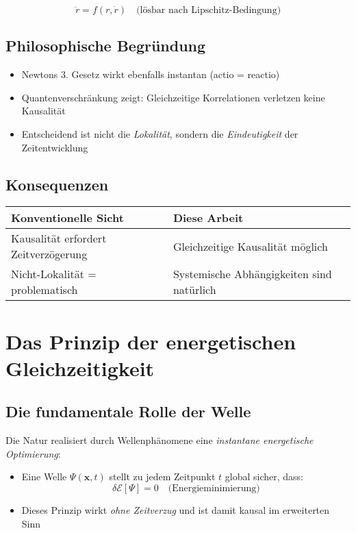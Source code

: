 \begin{equation}
    \ddot{r} = f(r, \dot{r}) \quad \text{(lösbar nach Lipschitz-Bedingung)}
\end{equation}

\subsection{Philosophische Begründung}
\begin{itemize}
    \item Newtons 3. Gesetz wirkt ebenfalls instantan (actio = reactio)
    \item Quantenverschränkung zeigt: Gleichzeitige Korrelationen verletzen keine Kausalität
    \item Entscheidend ist nicht die \textit{Lokalität}, sondern die \textit{Eindeutigkeit} der Zeitentwicklung
\end{itemize}

\subsection{Konsequenzen}
\begin{tabular}{p{}p{}}
    \hline
    \textbf{Konventionelle Sicht} & \textbf{Diese Arbeit} \\
    \hline
    Kausalität erfordert Zeitverzögerung & Gleichzeitige Kausalität möglich \\
    Nicht-Lokalität = problematisch & Systemische Abhängigkeiten sind natürlich \\
    \hline
\end{tabular}

\section{Das Prinzip der energetischen Gleichzeitigkeit}
\label{sec:energetische_gleichzeitigkeit}

\subsection{Die fundamentale Rolle der Welle}
Die Natur realisiert durch Wellenphänomene eine \emph{instantane energetische Optimierung}:

\begin{itemize}
    \item Eine Welle $\Psi(\mathbf{x},t)$ stellt zu jedem Zeitpunkt $t$ global sicher, dass:
    \begin{equation}
        \delta \mathcal{E}[\Psi] = 0 \quad \text{(Energieminimierung)}
    \end{equation}
    
    \item Dieses Prinzip wirkt \emph{ohne Zeitverzug} und ist damit kausal im erweiterten Sinn
\end{itemize}


